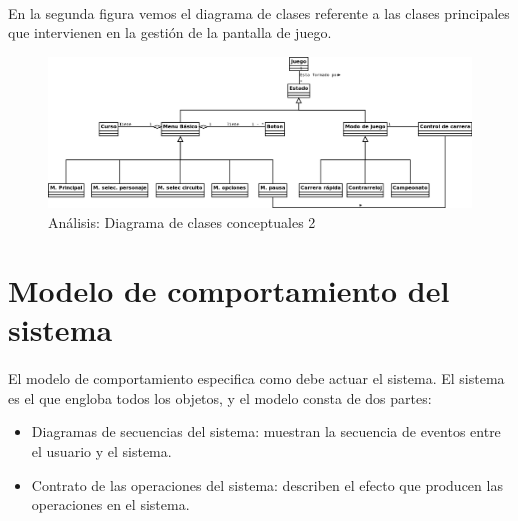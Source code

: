 \paragraph{}
En la segunda figura vemos el diagrama de clases referente a las clases principales que intervienen en la gestión de la pantalla
de juego.

\begin{figure}[H]
  \label{diagrama_clases_conceptuales}
  \begin{center}
    \includegraphics[scale=0.4, angle=90]{imagenes/analisis/diagrama_clases_conceptuales1.png}
  \end{center}
  \caption{Análisis: Diagrama de clases conceptuales 2}
\end{figure}

\section{Modelo de comportamiento del sistema}

\paragraph{}
El modelo de comportamiento especifica como debe actuar el sistema. El sistema es el que engloba todos los objetos, y el modelo
consta de dos partes:

\begin{itemize}
    \item Diagramas de secuencias del sistema: muestran la secuencia de eventos entre el usuario y el sistema.
    \item Contrato de las operaciones del sistema: describen el efecto que producen las operaciones en el sistema.
\end{itemize}

